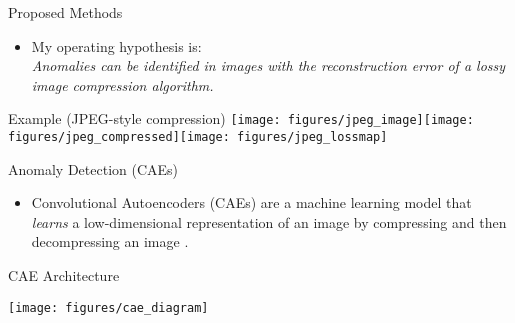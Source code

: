 \documentclass[10pt]{beamer}
\begin{document}
\begin{frame}{Proposed Methods}
\begin{itemize}

\item My operating hypothesis is:\\ 
\alert{\textit{Anomalies can be identified in images with the reconstruction error of a lossy image compression algorithm.}}\\[2cm]
\end{itemize}


\begin{exampleblock}{Example (JPEG-style compression)}
\texttt{[image: figures/jpeg\_image]}\texttt{[image: figures/jpeg\_compressed]}\texttt{[image: figures/jpeg\_lossmap]}
\end{exampleblock}


\end{frame}

%
%
%
%
%
%
%

\begin{frame}{Anomaly Detection (CAEs)}

\begin{itemize}
\item Convolutional Autoencoders (CAEs) are a machine learning model that \textit{learns} a low-dimensional representation of an image by compressing and then decompressing an image \cite{wta_detection, attention_anomalies}.\\[1cm]
\end{itemize}

\begin{exampleblock}{CAE Architecture}
\begin{center}
\texttt{[image: figures/cae\_diagram]}
\end{center}
\end{exampleblock}

\end{frame}
\end{document}
